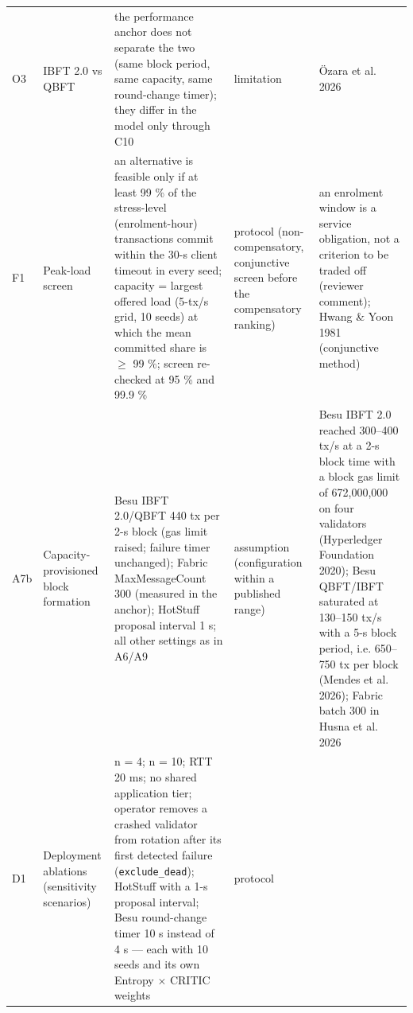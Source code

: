 \documentclass[a4paper,10pt]{article}
\begin{document}
\begin{longtable}{>{\raggedright\arraybackslash}p{0.9cm} >{\raggedright\arraybackslash}p{3.2cm} >{\raggedright\arraybackslash}p{8.6cm} >{\raggedright\arraybackslash}p{2.6cm} >{\raggedright\arraybackslash}p{7.2cm}}
O3 & IBFT 2.0 vs QBFT & the performance anchor does not separate the two (same block period, same capacity, same round-change timer); they differ in the model only through C10 & limitation & \"Ozara et al. 2026\\
F1 & Peak-load screen & an alternative is feasible only if at least 99 \% of the stress-level (enrolment-hour) transactions commit within the 30-s client timeout in every seed; capacity = largest offered load (5-tx/s grid, 10 seeds) at which the mean committed share is $\geq$ 99 \%; screen re-checked at 95 \% and 99.9 \% & protocol (non-compensatory, conjunctive screen before the compensatory ranking) & an enrolment window is a service obligation, not a criterion to be traded off (reviewer comment); Hwang \& Yoon 1981 (conjunctive method)\\
A7b & Capacity-provisioned block formation & Besu IBFT 2.0/QBFT 440 tx per 2-s block (gas limit raised; failure timer unchanged); Fabric MaxMessageCount 300 (measured in the anchor); HotStuff proposal interval 1 s; all other settings as in A6/A9 & assumption (configuration within a published range) & Besu IBFT 2.0 reached 300--400 tx/s at a 2-s block time with a block gas limit of 672,000,000 on four validators (Hyperledger Foundation 2020); Besu QBFT/IBFT saturated at 130--150 tx/s with a 5-s block period, i.e. 650--750 tx per block (Mendes et al. 2026); Fabric batch 300 in Husna et al. 2026\\
D1 & Deployment ablations (sensitivity scenarios) & n = 4; n = 10; RTT 20 ms; no shared application tier; operator removes a crashed validator from rotation after its first detected failure (\texttt{exclude\_dead}); HotStuff with a 1-s proposal interval; Besu round-change timer 10 s instead of 4 s --- each with 10 seeds and its own Entropy $\times$ CRITIC weights & protocol & \\
\end{longtable}
\end{document}
